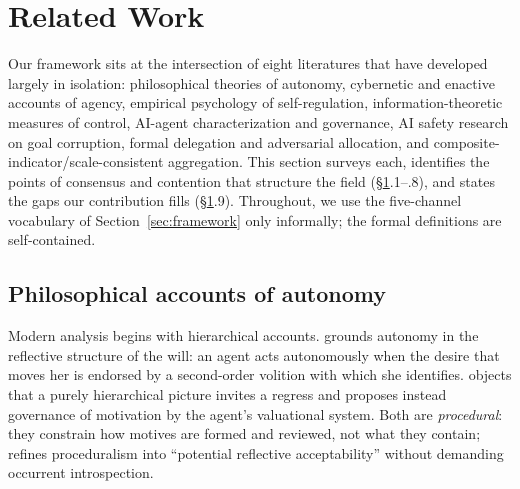 %
%

\section{Related Work}\label{sec:related-work}

Our framework sits at the intersection of eight literatures that have
developed largely in isolation: philosophical theories of autonomy, cybernetic
and enactive accounts of agency, empirical psychology of self-regulation,
information-theoretic measures of control, AI-agent characterization and
governance, AI safety research on goal corruption, formal delegation and
adversarial allocation, and composite-indicator/scale-consistent aggregation.
This section surveys each, identifies the points of consensus and contention
that structure the field (\S\ref{sec:related-work}.1--.8), and states the gaps
our contribution fills (\S\ref{sec:related-work}.9). Throughout, we use the
five-channel vocabulary of Section~\ref{sec:framework} only informally; the
formal definitions are self-contained.

\subsection{Philosophical accounts of autonomy}\label{rw:philosophy}

Modern analysis begins with hierarchical accounts. \citet{frankfurt1971}
grounds autonomy in the reflective structure of the will: an agent acts
autonomously when the desire that moves her is endorsed by a second-order
volition with which she identifies. \citet{watson1975} objects that a purely
hierarchical picture invites a regress and proposes instead governance of
motivation by the agent's valuational system. Both are \emph{procedural}: they
constrain how motives are formed and reviewed, not what they contain;
\citet{christman2004} refines proceduralism into ``potential reflective
acceptability'' without demanding occurrent introspection.

